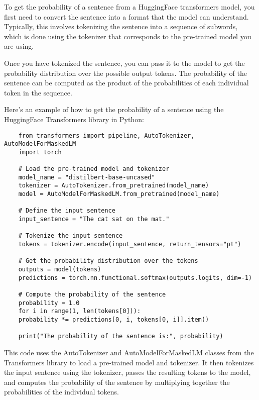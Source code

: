 \documentclass{article}
\begin{document}
To get the probability of a sentence from a HuggingFace transformers model, you first need to convert the sentence into a format that the model can understand. Typically, this involves tokenizing the sentence into a sequence of subwords, which is done using the tokenizer that corresponds to the pre-trained model you are using.

Once you have tokenized the sentence, you can pass it to the model to get the probability distribution over the possible output tokens. The probability of the sentence can be computed as the product of the probabilities of each individual token in the sequence.

Here's an example of how to get the probability of a sentence using the HuggingFace Transformers library in Python:

\begin{verbatim}
    from transformers import pipeline, AutoTokenizer, AutoModelForMaskedLM
    import torch
    
    # Load the pre-trained model and tokenizer
    model_name = "distilbert-base-uncased"
    tokenizer = AutoTokenizer.from_pretrained(model_name)
    model = AutoModelForMaskedLM.from_pretrained(model_name)
    
    # Define the input sentence
    input_sentence = "The cat sat on the mat."
    
    # Tokenize the input sentence
    tokens = tokenizer.encode(input_sentence, return_tensors="pt")
    
    # Get the probability distribution over the tokens
    outputs = model(tokens)
    predictions = torch.nn.functional.softmax(outputs.logits, dim=-1)
    
    # Compute the probability of the sentence
    probability = 1.0
    for i in range(1, len(tokens[0])):
    probability *= predictions[0, i, tokens[0, i]].item()
    
    print("The probability of the sentence is:", probability)
\end{verbatim}

This code uses the AutoTokenizer and AutoModelForMaskedLM classes from the Transformers library to load a pre-trained model and tokenizer. It then tokenizes the input sentence using the tokenizer, passes the resulting tokens to the model, and computes the probability of the sentence by multiplying together the probabilities of the individual tokens.



\end{document}
